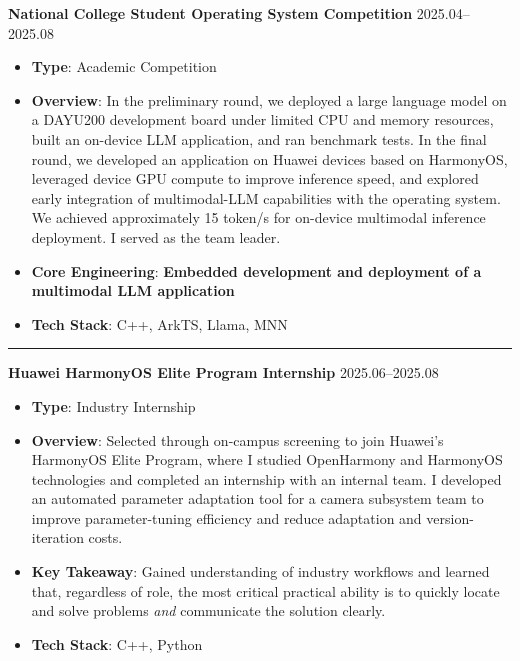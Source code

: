 \documentclass[11pt]{article}
\begin{document}
\textbf{\large \color{CVBlue} National College Student Operating System Competition} \hfill 2025.04--2025.08
\begin{itemize}
    \item \textbf{Type}: Academic Competition
    \item \textbf{Overview}: In the preliminary round, we deployed a large language model on a DAYU200 development board under limited CPU and memory resources, built an on-device LLM application, and ran benchmark tests.
    In the final round, we developed an application on Huawei devices based on HarmonyOS, leveraged device GPU compute to improve inference speed, and explored early integration of multimodal-LLM capabilities with the operating system.
    We achieved approximately 15 token/s for on-device multimodal inference deployment. I served as the team leader.
    \item[\textcolor{CVBlue}{\faStar}]\textbf{\textcolor{CVBlue}{Core Engineering}}: \textbf{Embedded development and deployment of a multimodal LLM application}
    \item \textbf{Tech Stack}: C++, ArkTS, Llama, MNN
\end{itemize}

\par\noindent\textcolor{black!20}{\rule{\linewidth}{0.5pt}}

\vspace*{0.1em}

\textbf{\large \color{CVBlue} Huawei HarmonyOS Elite Program Internship} \hfill 2025.06--2025.08
\begin{itemize}
    \item \textbf{Type}: Industry Internship

    \item \textbf{Overview}: Selected through on-campus screening to join Huawei's HarmonyOS Elite Program, where I studied OpenHarmony and HarmonyOS technologies and completed an internship with an internal team.
    I developed an automated parameter adaptation tool for a camera subsystem team to improve parameter-tuning efficiency and reduce adaptation and version-iteration costs.
    \item[\textcolor{CVBlue}{\faStar}] \textbf{\textcolor{CVBlue}{Key Takeaway}}: Gained understanding of industry workflows and learned that, regardless of role, the most critical practical ability is to quickly locate and solve problems \emph{and} communicate the solution clearly.
    \item \textbf{Tech Stack}: C++, Python
\end{itemize}
\end{document}
